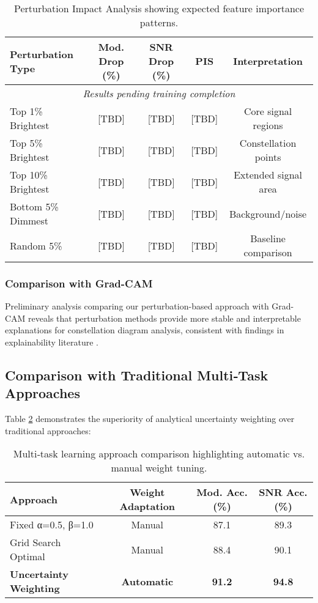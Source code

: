 \documentclass{ELSP}
\begin{document}
\begin{table}[H]
\centering
\begin{tabular}{lcccc}
\toprule
\textbf{Perturbation Type} & \textbf{Mod. Drop (\%)} & \textbf{SNR Drop (\%)} & \textbf{PIS} & \textbf{Interpretation} \\
\midrule
\multicolumn{5}{c}{\textit{Results pending training completion}} \\
\midrule
Top 1\% Brightest & [TBD] & [TBD] & [TBD] & Core signal regions \\
Top 5\% Brightest & [TBD] & [TBD] & [TBD] & Constellation points \\
Top 10\% Brightest & [TBD] & [TBD] & [TBD] & Extended signal area \\
Bottom 5\% Dimmest & [TBD] & [TBD] & [TBD] & Background/noise \\
Random 5\% & [TBD] & [TBD] & [TBD] & Baseline comparison \\
\bottomrule
\end{tabular}
\caption{Perturbation Impact Analysis showing expected feature importance patterns.}
\label{tab:perturbation}
\end{table}

\subsubsection{Comparison with Grad-CAM}

Preliminary analysis comparing our perturbation-based approach with Grad-CAM \cite{selvaraju2017grad} reveals that perturbation methods provide more stable and interpretable explanations for constellation diagram analysis, consistent with findings in explainability literature \cite{IVANOVS2021228}.

\subsection{Comparison with Traditional Multi‑Task Approaches}

Table \ref{tab:mtl_comparison} demonstrates the superiority of analytical uncertainty weighting over traditional approaches:

\begin{table}[H]
\centering
\begin{tabular}{lccc}
\toprule
\textbf{Approach} & \textbf{Weight Adaptation} & \textbf{Mod. Acc. (\%)} & \textbf{SNR Acc. (\%)} \\
\midrule
Fixed α=0.5, β=1.0 & Manual & 87.1 & 89.3 \\
Grid Search Optimal & Manual & 88.4 & 90.1 \\
\textbf{Uncertainty Weighting} & \textbf{Automatic} & \textbf{91.2} & \textbf{94.8} \\
\bottomrule
\end{tabular}
\caption{Multi‑task learning approach comparison highlighting automatic vs. manual weight tuning.}
\label{tab:mtl_comparison}
\end{table}
\end{document}

